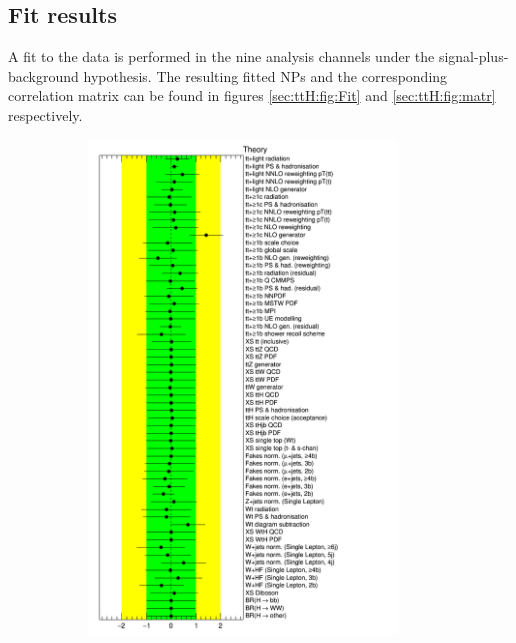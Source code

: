\subsection{Fit results}

A fit to the data is performed in the nine analysis channels under the signal-plus-background hypothesis. The resulting fitted NPs and the corresponding correlation matrix can be found in figures \ref{sec:ttH:fig:Fit} and \ref{sec:ttH:fig:matr} respectively.


\begin{figure}[htbp!]
\begin{subfigure}{0.5\textwidth}
  \centering
  \includegraphics[width=0.9\textwidth]{figures/ttH/NuisPar_Theory.png}
\end{subfigure}
\begin{subfigure}{0.5\textwidth}
  \centering

\end{subfigure}
\end{figure}
